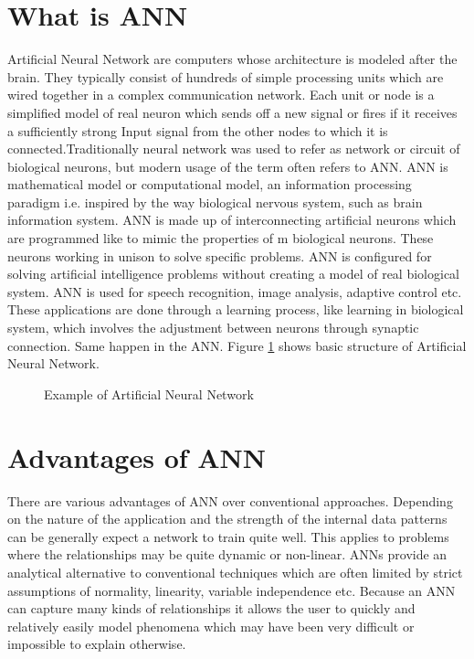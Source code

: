 \documentclass[12pt]{report}
\begin{document}
\section{What is ANN}
Artificial Neural Network are computers whose architecture is modeled after the brain. They typically consist of hundreds of simple processing units which are wired together in a complex communication network. Each unit or node is a simplified model of real neuron which sends off a new signal or fires if it receives a sufficiently strong Input signal from the other nodes to which it is connected.Traditionally neural network was used to refer as network or circuit of biological neurons, but modern usage of the term often refers to ANN. ANN is mathematical model or computational model, an information processing paradigm i.e. inspired by the way biological nervous system, such as brain information system. ANN is made up of interconnecting artificial neurons which are programmed like to mimic the properties of m biological neurons. These neurons working in unison to solve specific problems. ANN is configured for solving artificial intelligence problems without creating a model of real biological system. ANN is used for speech recognition, image analysis, adaptive control etc. These applications are done through a learning process, like learning in biological system, which involves the adjustment between neurons through synaptic connection. Same happen in the ANN. Figure \ref{ANN} shows basic structure of Artificial Neural Network.
\begin{figure}[htbp]
	\caption{Example of Artificial Neural Network}
	\label{ANN}
\end{figure}
\section{Advantages of ANN}
There are various advantages of ANN over conventional approaches. Depending on the nature of the application and the strength of the internal data patterns can be generally expect a network to train quite well. This applies to problems where the relationships may be quite dynamic or non-linear. ANNs provide an analytical alternative to conventional techniques which are often limited by strict assumptions of normality, linearity, variable independence etc. Because an ANN can capture many kinds of relationships it allows the user to quickly and relatively easily model phenomena which may have been very difficult or impossible to explain otherwise.
\iffalse
\end{document}
